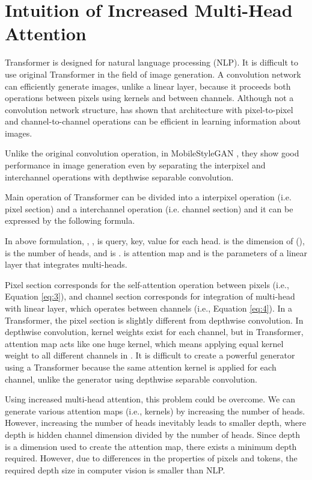 \documentclass[10pt,twocolumn,letterpaper]{article}
\begin{document}
\section{Intuition of Increased Multi-Head Attention}
\label{app:C}
Transformer is designed for natural language processing (NLP). It is difficult to use original 
Transformer in the field of image generation.
A convolution network can efficiently generate images, unlike a linear layer, because it proceeds both operations between pixels using kernels and between channels. Although not a convolution network structure, \cite{tolstikhin2021mlpmixer} has shown that architecture with pixel-to-pixel and channel-to-channel operations can be efficient in learning information about images.

Unlike the original convolution operation, in MobileStyleGAN \cite{belousov2021mobilestylegan}, they show good performance in image generation even by separating the interpixel and interchannel operations with depthwise separable convolution.

Main operation of Transformer can be divided into a interpixel operation (i.e. pixel section) and a interchannel operation (i.e. channel section) and it can be expressed by the following formula.

In above formulation, , ,  is query, key, value for each head.  is the dimension of (),  is the number of heads, and  is .   is attention map and  is the parameters of a linear layer that integrates multi-heads.  

 Pixel section corresponds for the self-attention operation between pixels (i.e., Equation \ref{eq:3}), and channel section corresponds for integration of multi-head with linear layer, which operates between channels (i.e., Equation \ref{eq:4}). In a Transformer, the pixel section is slightly different from depthwise convolution. In depthwise convolution, kernel weights exist for each channel, but in Transformer, attention map  acts like one huge kernel, which means applying equal kernel weight to all different channels in .  
It is difficult to create a powerful generator using a Transformer because the same attention kernel is applied for each channel, unlike the generator using depthwise separable convolution. 

Using increased multi-head attention, this problem could be overcome. We can generate various attention maps (i.e., kernels) by increasing the number of heads. However, increasing the number of heads inevitably leads to smaller depth, where depth is hidden channel dimension divided by the number of heads. Since depth is a dimension used to create the attention map, there exists a minimum depth required. However, due to differences in the properties of pixels and tokens, the required depth size in computer vision is smaller than NLP.
\end{document}
